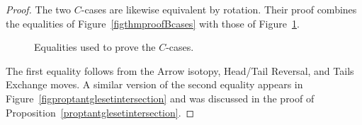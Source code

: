 \documentclass[10pt,a4paper]{amsart}
\begin{document}
\begin{proof}
The two $C$-cases are likewise equivalent by rotation. Their proof combines the equalities of Figure~\ref{figthmproofBcases} with those of Figure~\ref{figthmproofCcases}.

\begin{figure}[!htbp]
\centering

\caption{Equalities used to prove the $C$-cases.}
\label{figthmproofCcases}
\end{figure}

The first equality follows from the Arrow isotopy, Head/Tail Reversal, and Tails Exchange moves. A similar version of the second equality appears in Figure~\ref{figproptantglesetintersection} and was discussed in the proof of Proposition~\ref{proptantglesetintersection}.
\end{proof}
\end{document}
